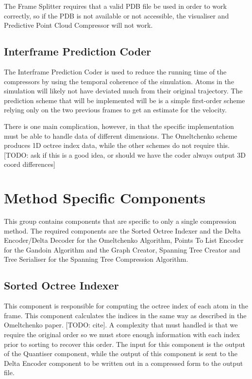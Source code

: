 \documentclass[a4paper,11pt]{report}
\begin{document}
The Frame Splitter requires that a valid PDB file be used in order to work correctly, so if the PDB is not available or not accessible, the visualiser and Predictive Point Cloud Compressor will not work.

\subsection{Interframe Prediction Coder}

The Interframe Prediction Coder is used to reduce the running time of the compressors by using the temporal coherence of the simulation. Atoms in the simulation will likely not have deviated much from their original trajectory. The prediction scheme that will be implemented will be is a simple first-order scheme relying only on the two previous frames to get an estimate for the velocity.

There is one main complication, however, in that the specific implementation must be able to handle data of different dimensions. The Omeltchenko scheme produces 1D octree index data, while the other schemes do not require this. [TODO: ask if this is a good idea, or should we have the coder always output 3D coord differences]

\section{Method Specific Components}

This group contains components that are specific to only a single compression method. The required components are the Sorted Octree Indexer and the Delta Encoder/Delta Decoder for the Omeltchenko Algorithm,  Points To List Encoder for the Gandoin Algorithm and the Graph Creator, Spanning Tree Creator and Tree Serialiser for the Spanning Tree Compression Algorithm.

\subsection{Sorted Octree Indexer}

This component is responsible for computing the octree index of each atom in the frame. This component calculates the indices in the same way as described in the Omeltchenko paper. [TODO: cite]. A complexity that must handled is that we require the original order so we must store enough information with each index prior to sorting to recover this order. The input for this component is the output of the Quantiser component, while the output of this component is sent to the Delta Encoder component to be written out in a compressed form to the output file. 
\end{document}
